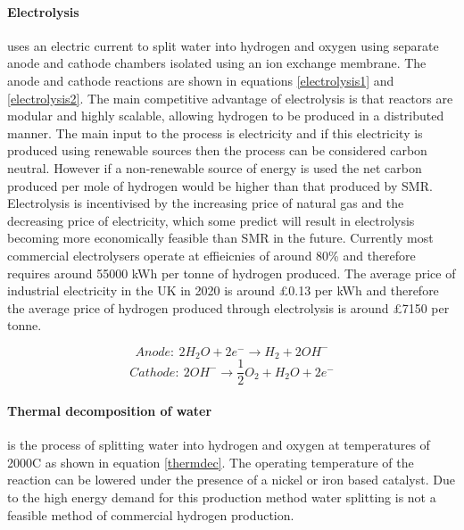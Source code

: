 \paragraph{Electrolysis} uses an electric current to split water into hydrogen and oxygen using separate anode and cathode chambers isolated using an ion exchange membrane. The anode and cathode reactions are shown in equations \ref{electrolysis1} and \ref{electrolysis2}. The main competitive advantage of electrolysis is that reactors are modular and highly scalable, allowing hydrogen to be produced in a distributed manner. \cite{Acar2014} The main input to the process is electricity and if this electricity is produced using renewable sources then the process can be considered carbon neutral. However if a non-renewable source of energy is used the net carbon produced per mole of hydrogen would be higher than that produced by SMR. \cite{Koroneos2004}
Electrolysis is incentivised by the increasing price of natural gas and the decreasing price of electricity, which some predict will result in electrolysis becoming more economically feasible than SMR in the future. \cite{Acar2014} Currently most commercial electrolysers operate at effieicnies of around 80\% and therefore requires around 55000 kWh per tonne of hydrogen produced. The average price of industrial electricity in the UK in 2020 is around £0.13 per kWh \cite{departmentforbusinessenergyindustrialstrategy_2020} and therefore the average price of hydrogen produced through electrolysis is around £7150 per tonne. \cite{hydrogencouncil_2020}


\begin{equation}\label{electrolysis1}
Anode: \: 2H_2 O +  2e^- \rightarrow H_2 + 2OH^-
\end{equation}
\begin{equation}\label{electrolysis2}
Cathode: \: 2OH^- \rightarrow \frac{1}{2}O_2+ H_2 O + 2e^-
\end{equation}

\paragraph{Thermal decomposition of water} is the process of splitting water into hydrogen and oxygen at temperatures of 2000\textdegree C as shown in equation \ref{thermdec}. \cite{Holladay2009} The operating temperature of the reaction can be lowered under the presence of a nickel or iron based catalyst. \cite{Holladay2009} Due to the high energy demand for this production method water splitting is not a feasible method of commercial hydrogen production.

